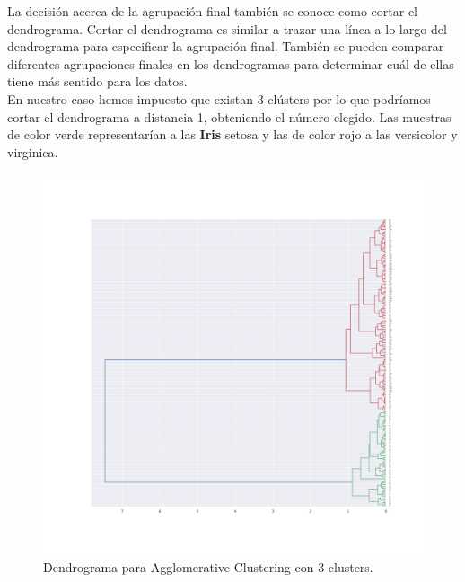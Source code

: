 \documentclass[a4paper, 20pt]{article}
\begin{document}
La decisión acerca de la agrupación final también se conoce como cortar el dendrograma. Cortar el dendrograma es similar a trazar una línea a lo largo del dendrograma para especificar la agrupación final. También se pueden comparar diferentes agrupaciones finales en los dendrogramas para determinar cuál de ellas tiene más sentido para los datos.\\

En nuestro caso hemos impuesto que existan 3 clústers por lo que podríamos cortar el dendrograma a distancia 1, obteniendo el número elegido. Las muestras de color verde representarían a las \textbf{Iris} setosa y las de color rojo a las versicolor y virginica.

\begin{figure}[h]
\centering
\includegraphics[scale=0.35]{dani/dendrogramAggClusterIRIS.png}
\caption{Dendrograma para Agglomerative Clustering con 3 clusters.}
\label{dac}
\end{figure}

\clearpage
\end{document}
